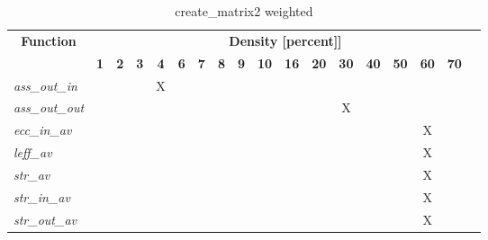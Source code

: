 \begin{table}[h] \centering \begin{tabular}{|l|c|c|c|c|c|c|c|c|c|c|c|c|c|c|c|c|} \hline\multicolumn{1}{|c|}{\textbf{\large{Function}}} & \multicolumn{17}{c|}{\large{\textbf{Density [percent]]}}}\\\cline{2-18}  & \textbf{1} &  \textbf{2} &  \textbf{3} &  \textbf{4} &  \textbf{6} &  \textbf{7} &  \textbf{8} &  \textbf{9} &  \textbf{10} &  \textbf{16} &  \textbf{20} &  \textbf{30} &  \textbf{40} &  \textbf{50} &  \textbf{60} &  \textbf{70} \\ \hline   \textit{ass\_out\_in} &   &   &   & X &   &   &   &   &   &   &   &   &   &   &   &   \\ \hline  \textit{ass\_out\_out} &   &   &   &   &   &   &   &   &   &   &   & X &   &   &   &   \\ \hline  \textit{ecc\_in\_av} &   &   &   &   &   &   &   &   &   &   &   &   &   &   & X &   \\ \hline  \textit{leff\_av} &   &   &   &   &   &   &   &   &   &   &   &   &   &   & X &   \\ \hline  \textit{str\_av} &   &   &   &   &   &   &   &   &   &   &   &   &   &   & X &   \\ \hline  \textit{str\_in\_av} &   &   &   &   &   &   &   &   &   &   &   &   &   &   & X &   \\ \hline  \textit{str\_out\_av} &   &   &   &   &   &   &   &   &   &   &   &   &   &   & X &   \\ \hline \end{tabular}\caption{create\_matrix2 weighted}\label{tab:my_label} \end{table}